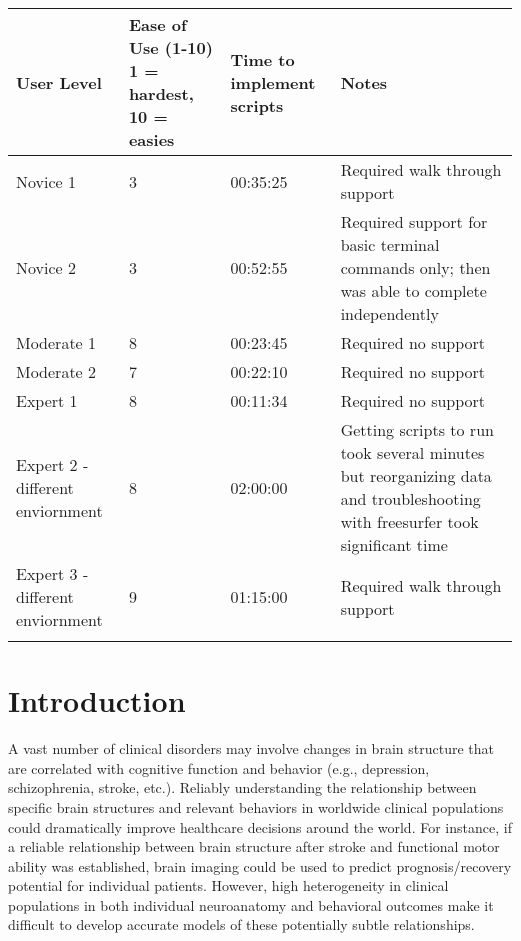 \documentclass[twocolumn]{bmcart}%
\begin{document}
\begin{table*}
\begin{tabular*}{\textwidth}{p{3cm}p{2cm}p{4cm}p{6cm}}
  User Level  & Ease of Use (1-10) 1 = hardest, 10 = easies & Time to implement scripts & Notes \\
    \hline\noalign{\smallskip}
  Novice 1     &     3     &     00:35:25     &     Required walk through support   \\
  Novice 2     &     3     &     00:52:55     &     Required support for basic terminal commands only; then was able to complete independently   \\
  Moderate 1     &     8     &     00:23:45     &     Required no support   \\
  Moderate 2     &     7     &     00:22:10     &     Required no support   \\
  Expert 1     &     8     &     00:11:34     &     Required no support   \\
  Expert 2 - different enviornment     &     8     &     02:00:00     &     Getting scripts to run took several minutes but reorganizing data and troubleshooting with freesurfer took significant time   \\ 
  Expert 3 - different enviornment     &     9     &     01:15:00     &     Required walk through support   \\ 
  \noalign{\smallskip}\hline
\end{tabular*}
\end{table*}

\section{Introduction}\label{introduction}

A vast number of clinical disorders may involve changes in brain
structure that are correlated with cognitive function and behavior
(e.g., depression, schizophrenia, stroke, etc.). Reliably understanding
the relationship between specific brain structures and relevant
behaviors in worldwide clinical populations could dramatically improve
healthcare decisions around the world. For instance, if a reliable
relationship between brain structure after stroke and functional motor
ability was established, brain imaging could be used to predict
prognosis/recovery potential for individual patients. However, high
heterogeneity in clinical populations in both individual neuroanatomy
and behavioral outcomes make it difficult to develop accurate models of
these potentially subtle relationships.
\end{document}
